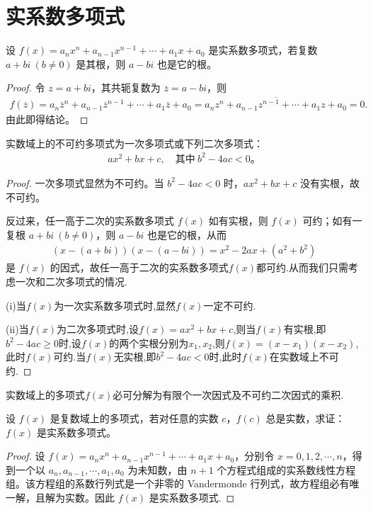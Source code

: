 \documentclass[../../main.tex]{subfiles}%
\begin{document}
\section{实系数多项式}

\begin{theorem}[实系数多项式的复根成对出现]\label{theorem:实系数多项式的复根成对出现}
设 $f(x) = a_n x^n + a_{n-1} x^{n-1} + \cdots + a_1 x + a_0$ 是实系数多项式，若复数 $a + bi \ (b \neq 0)$ 是其根，则 $a - bi$ 也是它的根。
\end{theorem}
\begin{proof}
令 $z = a + bi$，其共轭复数为 $\overline{z} = a - bi$，则
\begin{align*}
f(\overline{z})=a_n\overline{z}^n+a_{n-1}\overline{z}^{n-1}+\cdots +a_1\overline{z}+a_0=\overline{a_nz^n+a_{n-1}z^{n-1}+\cdots +a_1z+a_0}=0.
\end{align*}
由此即得结论。
\end{proof}

\begin{corollary}
实数域上的不可约多项式为一次多项式或下列二次多项式：
\begin{align*}
ax^2 + bx + c, \quad \text{其中} \ b^2 - 4ac < 0。
\end{align*}
\end{corollary}
\begin{proof}
一次多项式显然为不可约。当 $b^2 - 4ac < 0$ 时，$ax^2 + bx + c$ 没有实根，故不可约。

反过来，任一高于二次的实系数多项式 $f(x)$ 如有实根，则 $f(x)$ 可约；如有一复根 $a + bi \ (b \neq 0)$，则 $a - bi$ 也是它的根，从而
\begin{align*}
(x - (a + bi))(x - (a - bi)) = x^2 - 2ax + (a^2 + b^2)
\end{align*}
是 $f(x)$ 的因式，故任一高于二次的实系数多项式$f(x)$都可约.从而我们只需考虑一次和二次多项式的情况.

(i)当$f(x)$为一次实系数多项式时,显然$f(x)$一定不可约.

(ii)当$f(x)$为二次多项式时,设$f(x)=ax^2+bx+c$,则当$f(x)$有实根,即$b^2-4ac\geqslant  0$时,设$f(x)$的两个实根分别为$x_1,x_2$,则$f(x)=(x-x_1)(x-x_2)$,此时$f(x)$可约.当$f(x)$无实根,即$b^2-4ac<0$时,此时$f(x)$在实数域上不可约.
\end{proof}

\begin{corollary}
实数域上的多项式$f(x)$必可分解为有限个一次因式及不可约二次因式的乘积.
\end{corollary}

\begin{proposition}\label{proposition:实系数多项式的判定条件}
设 $f(x)$ 是复数域上的多项式，若对任意的实数 $c$，$f(c)$ 总是实数，求证：$f(x)$ 是实系数多项式。
\end{proposition}
\begin{proof}
设 $f(x) = a_n x^n + a_{n-1} x^{n-1} + \cdots + a_1 x + a_0$，分别令 $x = 0, 1, 2, \cdots, n$，得到一个以 $a_n, a_{n-1}, \cdots, a_1, a_0$ 为未知数，由 $n + 1$ 个方程式组成的实系数线性方程组。该方程组的系数行列式是一个非零的 Vandermonde 行列式，故方程组必有唯一解，且解为实数。因此 $f(x)$ 是实系数多项式.
\end{proof}
\end{document}
